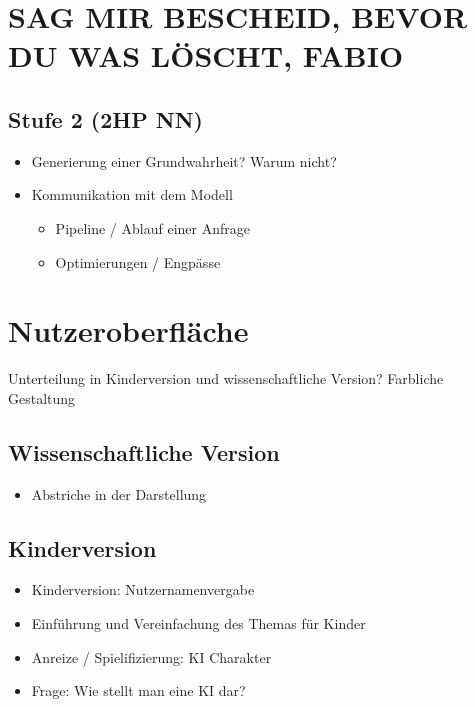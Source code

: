 \documentclass[a4paper]{extarticle}
\begin{document}
    \section*{SAG MIR BESCHEID, BEVOR DU WAS LÖSCHT, FABIO}
    
    \subsection{Stufe 2 (2HP NN)}
    \begin{itemize}
        \item Generierung einer Grundwahrheit? Warum nicht?
        \item Kommunikation mit dem Modell
        \begin{itemize}
            \item Pipeline / Ablauf einer Anfrage
            \item Optimierungen / Engpässe
        \end{itemize}
    \end{itemize}

    \section{Nutzeroberfläche}

    Unterteilung in Kinderversion und wissenschaftliche Version?
    Farbliche Gestaltung
    
    \subsection{Wissenschaftliche Version}
    \begin{itemize}
        \item Abstriche in der Darstellung
    \end{itemize}

    \subsection{Kinderversion}
    \begin{itemize}
        \item Kinderversion: Nutzernamenvergabe
        \item Einführung und Vereinfachung des Themas für Kinder 
        \item Anreize / Spielifizierung: KI Charakter
        \item Frage: Wie stellt man eine KI dar?
    \end{itemize}
    
\end{document}
